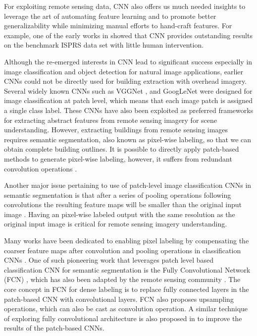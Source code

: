 \documentclass[journal]{IEEEtran}
\begin{document}
For exploiting remote sensing data, CNN also offers us much needed insights to leverage the art of automating feature learning and to promote better generalizability while minimizing manual efforts to hand-craft features. For example, one of the early works in \cite{PaisitkriangkraiSherrahJanneyEtAl2016} showed that CNN provides outstanding results on the benchmark ISPRS data set with little human intervention.

Although the re-emerged interests in CNN lead to significant success especially in image classification and object detection for natural image applications, earlier CNNs could not be directly used for building extraction with overhead imagery. Several widely known CNNs such as VGGNet \cite{Simonyan2015}, and GoogLeNet \cite{SzegedyLiuJiaEtAl2015} were designed for image classification at patch level, which means that each image patch is assigned a single class label. These CNNs have also been exploited as preferred frameworks for extracting abstract features from remote sensing imagery for scene understanding. However, extracting buildings from remote sensing images requires semantic segmentation, also known as pixel-wise labeling, so that we can obtain complete building outlines. It is possible to directly apply patch-based methods to generate pixel-wise labeling, however, it suffers from redundant convolution operations \cite{ShelhamerLongDarrell2017}. 

Another major issue pertaining to use of patch-level image classification CNNs in semantic segmentation is that after a series of pooling operations following convolutions the resulting feature maps will be smaller than the original input image \cite{Goodfellow2016}. Having an pixel-wise labeled output with the same resolution as the original input image is critical for remote sensing imagery understanding. 

Many works have been dedicated to enabling pixel labeling by compensating the coarser feature maps after convolution and pooling operations in classification CNNs \cite{NoordPostma2017}. One of such pioneering work that leverages patch level based classification CNN for semantic segmentation is the Fully Convolutional Network (FCN) \cite{ShelhamerLongDarrell2017}, which has also been adapted by the remote sensing community \cite{Sherrah2016}. The core concept in FCN for dense labeling is to replace fully connected layers in the patch-based CNN with convolutional layers. FCN also proposes upsampling operations, which can also be cast as convolution operation. A similar technique of exploring fully convolutional architecture is also proposed in \cite{Maggiori2016} to improve the results of the patch-based CNNs. 
\end{document}

